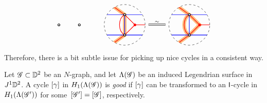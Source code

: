 \begin{remark}
\[\begin{tikzcd}
\begin{tikzpicture}[baseline=-.5ex]
\begin{scope}[xshift=3cm]
\draw[thick,black,fill=white] (-1/2,0) circle (0.05);
\draw[thick,black,fill=white] (1/2,0) circle (0.05);
\end{scope}
\end{tikzpicture}&
\begin{tikzpicture}[baseline=-.5ex]
\draw [dashed] (0,0) circle [radius=1];%
\clip (0,0) circle (1);
\draw [color=cyclecolor1, line cap=round, line width=5, opacity=0.5] (-1/2,{sqrt(3)/2}) -- (0,1/2)--(0,-1/2) -- (-1/2,{-sqrt(3)/2});
\draw [blue, thick] ({-sqrt(3)/2},1/2)--({sqrt(3)/2},1/2);
\draw [blue, thick] ({-sqrt(3)/2},-1/2)--({sqrt(3)/2},-1/2);
\draw [blue, thick] (0,1/2)--(0,-1/2);
\draw [red, thick] (-0.5,{sqrt(3)/2})--(0,1/2) to[out=-150,in=150] (0,-1/2)--(-0.5,{-sqrt(3)/2});
\draw [red, thick] (0,1/2)--(0.5,0) -- (1,0);
\draw [red, thick] (0,-1/2)--(0.5,0);
\draw[thick,black,fill=white] (0,1/2) circle (0.05);
\draw[thick,black,fill=white] (0,-1/2) circle (0.05);
\draw[thick,red,fill=red] (0.5,0) circle (0.05);
\end{tikzpicture}
\arrow[equal, r, "\sim"]&
\begin{tikzpicture}[baseline=-.5ex]
\draw [dashed] (3,0) circle [radius=1];%
\clip (3,0) circle (1);
\draw [color=cyclecolor1, line cap=round, line width=5, opacity=0.5] (5/2,{sqrt(3)/2})--(3,1/2) to[out=-150,in=150] (3,-0.5) (3,1/2) -- (3.5,0) -- (3,-1/2) (3,-0.5) -- (5/2,{-sqrt(3)/2});
\draw [blue, thick] ({3-sqrt(3)/2},1/2)--({3+sqrt(3)/2},1/2);
\draw [blue, thick] ({3-sqrt(3)/2},-1/2)--({3+sqrt(3)/2},-1/2);
\draw [blue, thick] (3,1/2)--(3,-1/2);
\draw [red, thick] (5/2,{sqrt(3)/2})--(3,1/2) to[out=-150,in=150] (3,-1/2)--(5/2,{-sqrt(3)/2});
\draw [red, thick] (3,1/2)--(7/2,0) -- (4,0);
\draw [red, thick] (3,-1/2)--(7/2,0);
\draw[thick,black,fill=white] (3,1/2) circle (0.05);
\draw[thick,black,fill=white] (3,-1/2) circle (0.05);
\draw[thick,red,fill=red] (7/2,0) circle (0.05);
\end{tikzpicture}
\end{tikzcd}
\]
Therefore, there is a bit subtle issue for picking up nice cycles in a consistent way.
\end{remark}


\begin{definition}\label{def:good cycle}
Let $\mathscr{G}\subset \mathbb{D}^2$ be an $N$-graph, and let $\Lambda(\mathscr{G})$ be an induced Legendrian surface in~$J^1\mathbb{D}^2$.
A cycle $[\gamma]$ in $H_1(\Lambda(\mathscr{G}))$ is \emph{good} if $[\gamma]$ can be transformed to an $\mathsf{I}$-cycle in $H_1(\Lambda(\mathscr{G}'))$ for some~$[\mathscr{G}']=[\mathscr{G}]$, respectively.
\end{definition}

